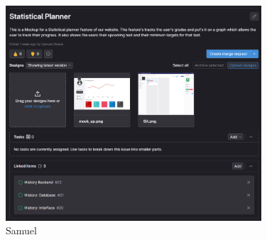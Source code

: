 \documentclass[a4paper]{article}
\begin{document}
\begin{figure}[H] %
	\centering %
	\includegraphics[width=0.85\textwidth]{./images/S2_History.png}
	\caption*{Samuel} %
	\label{Fig.S2_History} %
\end{figure}
\end{document}
